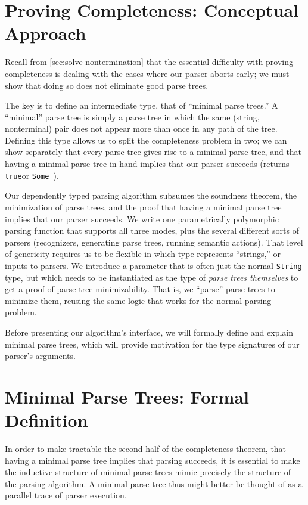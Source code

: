 \documentclass[preprint]{sigplanconf}
\newcommand{\true}{\texttt{true}}
\newcommand{\String}{\texttt{String}}
\newcommand{\hole}{\texttt{\_}}
\newcommand{\constructorname}[1]{\texttt{#1}}
\newcommand{\Some}[1]{\constructorname{Some}~#1}
\def\_{\textunderscore}
\begin{document}
\section{Proving Completeness: Conceptual Approach} \label{sec:conceptual-completeness} \label{sec:min:conceptual-intro}
  Recall from \autoref{sec:solve-nontermination} that the essential difficulty with proving completeness is dealing with the cases where our parser aborts early; we must show that doing so does not eliminate good parse trees.

  The key is to define an intermediate type, that of ``minimal parse trees.''  A ``minimal'' parse tree is simply a parse tree in which the same (string, nonterminal) pair does not appear more than once in any path of the tree.  Defining this type allows us to split the completeness problem in two; we can show separately that every parse tree gives rise to a minimal parse tree, and that having a minimal parse tree in hand implies that our parser succeeds (returns \true\space or \Some{\hole}).

  Our dependently typed parsing algorithm subsumes the soundness theorem, the minimization of parse trees, and the proof that having a minimal parse tree implies that our parser succeeds.  We write one parametrically polymorphic parsing function that supports all three modes, plus the several different sorts of parsers (recognizers, generating parse trees, running semantic actions).  That level of genericity requires us to be flexible in which type represents ``strings,'' or inputs to parsers.  We introduce a parameter that is often just the normal \String{} type, but which needs to be instantiated as the type of \emph{parse trees themselves} to get a proof of parse tree minimizability.  That is, we ``parse'' parse trees to minimize them, reusing the same logic that works for the normal parsing problem.

  Before presenting our algorithm's interface, we will formally define and explain minimal parse trees, which will provide motivation for the type signatures of our parser's arguments.

\section{Minimal Parse Trees: Formal Definition} \label{sec:min:formal-definition}
  In order to make tractable the second half of the completeness theorem, that having a minimal parse tree implies that parsing succeeds, it is essential to make the inductive structure of minimal parse trees mimic precisely the structure of the parsing algorithm.  A minimal parse tree thus might better be thought of as a parallel trace of parser execution.
\end{document}
